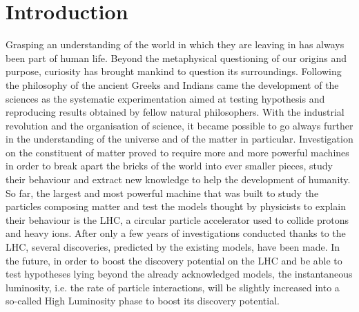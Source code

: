\renewcommand\evenpagerightmark{{\scshape\small Chapter 1}}
\renewcommand\oddpageleftmark{{\scshape\small Introduction}}

\renewcommand{\bibname}{References}

\hyphenation{}

\chapter[Introduction]%
{Introduction}
\label{chap:intro}

Grasping an understanding of the world in which they are leaving in has always been part of human life. Beyond the metaphysical questioning of our origins and purpose, curiosity has brought mankind to question its surroundings. Following the philosophy of the ancient Greeks and Indians came the development of the sciences as the systematic experimentation aimed at testing hypothesis and reproducing results obtained by fellow natural philosophers. With the industrial revolution and the organisation of science, it became possible to go always further in the understanding of the universe and of the matter in particular. Investigation on the constituent of matter proved to require more and more powerful machines in order to break apart the bricks of the world into ever smaller pieces, study their behaviour and extract new knowledge to help the development of humanity. So far, the largest and most powerful machine that was built to study the particles composing matter and test the models thought by physicists to explain their behaviour is the \acf{LHC}, a circular particle accelerator used to collide protons and heavy ions. After only a few years of investigations conducted thanks to the LHC, several discoveries, predicted by the existing models, have been made. In the future, in order to boost the discovery potential on the LHC and be able to test hypotheses lying beyond the already acknowledged models, the instantaneous luminosity, i.e. the rate of particle interactions, will be slightly increased into a so-called High Luminosity phase to boost its discovery potential.

